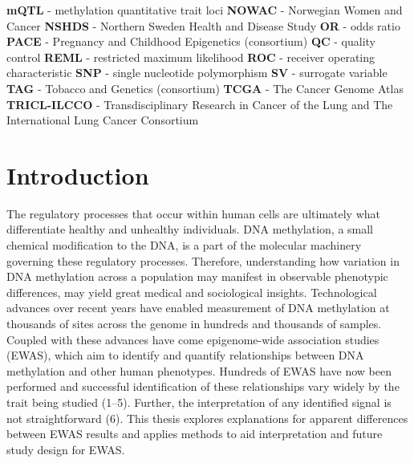 \documentclass[11pt,oneside]{bristolthesis}
\begin{document}
\begin{abbreviations}
    \textbf{mQTL} - methylation quantitative trait loci \newline
    \textbf{NOWAC} - Norwegian Women and Cancer \newline
    \textbf{NSHDS} - Northern Sweden Health and Disease Study \newline
    \textbf{OR} - odds ratio \newline
    \textbf{PACE} - Pregnancy and Childhood Epigenetics (consortium) \newline
    \textbf{QC} - quality control \newline
    \textbf{REML} - restricted maximum likelihood \newline
    \textbf{ROC} - receiver operating characteristic \newline
    \textbf{SNP} - single nucleotide polymorphism \newline
    \textbf{SV} - surrogate variable \newline
    \textbf{TAG} - Tobacco and Genetics (consortium) \newline
    \textbf{TCGA} - The Cancer Genome Atlas \newline
    \textbf{TRICL-ILCCO} - Transdisciplinary Research in Cancer of the Lung and The International Lung Cancer Consortium \newline
  \end{abbreviations}
\mainmatter %
\pagestyle{plain}
\hypertarget{introduction}{%
\chapter{Introduction}\label{introduction}}

The regulatory processes that occur within human cells are ultimately what differentiate healthy and unhealthy individuals. DNA methylation, a small chemical modification to the DNA, is a part of the molecular machinery governing these regulatory processes. Therefore, understanding how variation in DNA methylation across a population may manifest in observable phenotypic differences, may yield great medical and sociological insights. Technological advances over recent years have enabled measurement of DNA methylation at thousands of sites across the genome in hundreds and thousands of samples. Coupled with these advances have come epigenome-wide association studies (EWAS), which aim to identify and quantify relationships between DNA methylation and other human phenotypes. Hundreds of EWAS have now been performed and successful identification of these relationships vary widely by the trait being studied (1--5). Further, the interpretation of any identified signal is not straightforward (6). This thesis explores explanations for apparent differences between EWAS results and applies methods to aid interpretation and future study design for EWAS.
\end{document}
